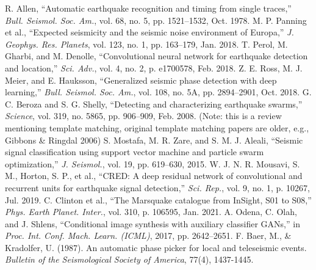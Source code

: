 \documentclass[conference]{IEEEtran}
\begin{document}
\begin{thebibliography}{00}
 R. Allen, ``Automatic earthquake recognition and timing from single traces,'' \emph{Bull. Seismol. Soc. Am.}, vol. 68, no. 5, pp. 1521--1532, Oct. 1978.
 M. P. Panning et al., ``Expected seismicity and the seismic noise environment of Europa,'' \emph{J. Geophys. Res. Planets}, vol. 123, no. 1, pp. 163--179, Jan. 2018.
 T. Perol, M. Gharbi, and M. Denolle, ``Convolutional neural network for earthquake detection and location,'' \emph{Sci. Adv.}, vol. 4, no. 2, p. e1700578, Feb. 2018.
 Z. E. Ross, M. J. Meier, and E. Hauksson, ``Generalized seismic phase detection with deep learning,'' \emph{Bull. Seismol. Soc. Am.}, vol. 108, no. 5A, pp. 2894--2901, Oct. 2018.
 G. C. Beroza and S. G. Shelly, ``Detecting and characterizing earthquake swarms,'' \emph{Science}, vol. 319, no. 5865, pp. 906--909, Feb. 2008. (Note: this is a review mentioning template matching, original template matching papers are older, e.g., Gibbons \& Ringdal 2006)
 S. Mostafa, M. R. Zare, and S. M. J. Aleali, ``Seismic signal classification using support vector machine and particle swarm optimization,'' \emph{J. Seismol.}, vol. 19, pp. 619--630, 2015.
 W. J. N. R. Mousavi, S. M., Horton, S. P., et al., ``CRED: A deep residual network of convolutional and recurrent units for earthquake signal detection,'' \emph{Sci. Rep.}, vol. 9, no. 1, p. 10267, Jul. 2019.
 C. Clinton et al., ``The Marsquake catalogue from InSight, S01 to S08,'' \emph{Phys. Earth Planet. Inter.}, vol. 310, p. 106595, Jan. 2021.
 A. Odena, C. Olah, and J. Shlens, ``Conditional image synthesis with auxiliary classifier GANs,'' in \emph{Proc. Int. Conf. Mach. Learn. (ICML)}, 2017, pp. 2642--2651.
 F. Baer, M., \& Kradolfer, U. (1987). An automatic phase picker for local and teleseismic events. \emph{Bulletin of the Seismological Society of America}, 77(4), 1437-1445.

\end{thebibliography}
\end{document}
